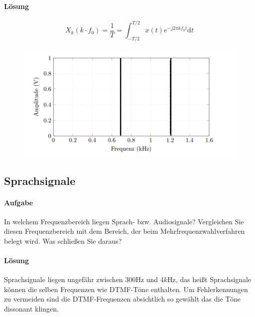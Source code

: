 \documentclass[10pt]{scrreprt}
\begin{document}
        \paragraph{Lösung}
        \begin{equation*}
            X_k (k \cdot f_0) = \frac{1}{T} = \int_{-T/2}^{T/2} x(t) e^{-j 2 \pi k f_0 t} \text{d}t
        \end{equation*}

        \begin{center}
            \begin{figure}[H]
                \includegraphics[width=\textwidth]{vorbereitenderBullshit3.png}
            \end{figure}
        \end{center}

        \subsection{Sprachsignale}
        \paragraph{Aufgabe}
        In welchem Frequenzbereich liegen Sprach- bzw. Audiosignale? Vergleichen Sie diesen
        Frequenzbereich mit dem Bereich, der beim Mehrfrequenzwahlverfahren belegt wird. Was
        schließen Sie daraus?

        \paragraph{Lösung}
        Sprachsignale liegen ungefähr zwischen $300\si{\hertz}$ und $4\si{k\hertz}$,
        das heißt Sprachsignale können die selben Frequenzen wie DTMF-Töne enthalten.
        Um Fehlerkennungen zu vermeiden sind die DTMF-Frequenzen absichtlich so
        gewählt das die Töne dissonant klingen.
\end{document}
